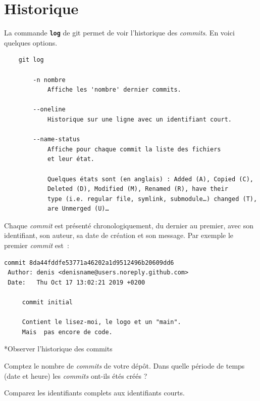 \documentclass[a4paper,11pt]{style-esi/td}
\begin{document}
\section{Historique}

La commande \texttt{\textbf{log}} de git permet de voir l'historique des
\textit{commits}. En voici quelques options. 

\begin{colxbox}[colback=white,drop fuzzy shadow]
\begin{verbatim}
	git log
	
	    -n nombre
	        Affiche les 'nombre' dernier commits.

	    --oneline
	        Historique sur une ligne avec un identifiant court.

	    --name-status
	        Affiche pour chaque commit la liste des fichiers 
	        et leur état.

	        Quelques états sont (en anglais) : Added (A), Copied (C), 
	        Deleted (D), Modified (M), Renamed (R), have their 
	        type (i.e. regular file, symlink, submodule…) changed (T), 
	        are Unmerged (U)…
\end{verbatim}
\end{colxbox}
\bigskip

Chaque \textit{commit} est présenté chronologiquement, du dernier au premier,
avec son identifiant, son auteur, sa date de création et son message. Par
exemple le premier \textit{commit} est~:

\begin{verbatim}
commit 8da44fddfe53771a46202a1d9512496b20609dd6
 Author: denis <denisname@users.noreply.github.com>
 Date:   Thu Oct 17 13:02:21 2019 +0200
 
     commit initial
     
     Contient le lisez-moi, le logo et un "main".
     Mais  pas encore de code.

\end{verbatim}

\pagebreak[4]
\begin{Exercice}*{Observer l'historique des commits}
	\begin{steps}
		
	\item Comptez le nombre de \textit{commits} de votre dépôt. Dans quelle
		période de temps (date et heure) les \textit{commits} ont-ils étés
		créés ? 

	\item Comparez les identifiants complets aux identifiants courts.

	\end{steps}
\end{Exercice}
\end{document}
